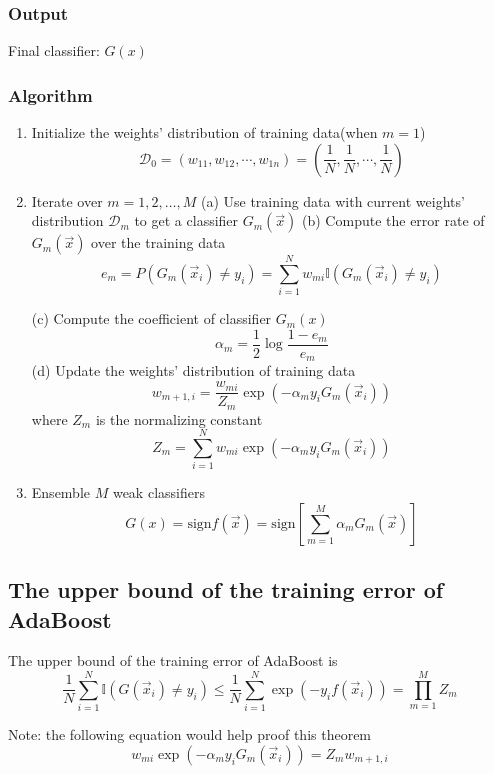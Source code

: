 \subsubsection{Output}
Final classifier: $G(x)$


\subsubsection{Algorithm}
\begin{enumerate}
\item Initialize the weights' distribution of training data(when $m=1$)
\begin{equation}\nonumber
\mathcal{D}_0=(w_{11},w_{12},\cdots,w_{1n})=(\frac{1}{N},\frac{1}{N},\cdots,\frac{1}{N})
\end{equation}
\item Iterate over $m=1,2,\dotsc,M$
\subitem (a) Use training data with current weights' distribution $\mathcal{D}_m$ to get a classifier $G_m(\vec{x})$
\subitem (b) Compute the error rate of $G_m(\vec{x})$ over the training data \\
\begin{equation}
e_m=P(G_m(\vec{x}_i)\neq y_i)=\sum_{i=1}^N {w_{mi}\mathbb{I}(G_m(\vec{x}_i) \neq y_i)}
\end{equation}

\subitem (c) Compute the coefficient of classifier $G_m(x)$
\begin{equation}
\alpha_m = \frac{1}{2}\log{\frac{1-e_m}{e_m}}
\end{equation}
\subitem (d) Update the weights' distribution of training data
\begin{equation}
w_{m+1,i}=\frac{w_{mi}}{Z_m}\exp(-\alpha_m y_i G_m(\vec{x}_i))
\end{equation}
where $Z_m$ is the normalizing constant
\begin{equation}
Z_m=\sum_{i=1}^N w_{mi}\exp(-\alpha_m y_i G_m(\vec{x}_i))
\end{equation}

\item Ensemble $M$ weak classifiers
\begin{equation}
G(x)=\text{sign}f(\vec{x})=\text{sign}\left[\sum_{m=1}^M \alpha_m G_m(\vec{x})\right]
\end{equation}
\end{enumerate} 

\subsection{The upper bound of the training error of AdaBoost}
\begin{theorem}
The upper bound of the training error of AdaBoost is 
\begin{equation}
\frac{1}{N} \sum_{i=1}^N \mathbb{I}(G(\vec{x}_i)\neq y_i) \leq \frac{1}{N} \sum_{i=1}^N \exp(-y_i f(\vec{x}_i))=\prod_{m=1}^M Z_m
\end{equation}

Note: the following equation would help proof this theorem
\begin{equation}
w_{mi}\exp(-\alpha_m y_i G_m(\vec{x}_i))=Z_m w_{m+1,i}
\end{equation}
\end{theorem}
